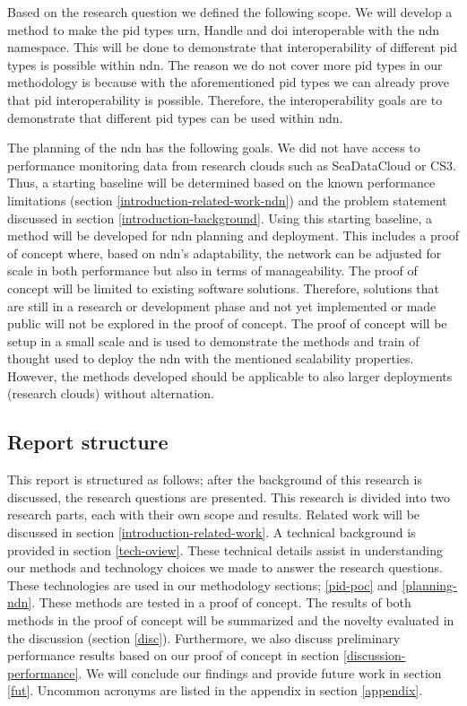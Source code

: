 
Based on the research question we defined the following scope. We will develop a method to make the \gls{pid} types \gls{urn}, Handle and \gls{doi} interoperable with the \gls{ndn} namespace. This will be done to demonstrate that interoperability of different \gls{pid} types is possible within \gls{ndn}. The reason we do not cover more \gls{pid} types in our methodology is because with the aforementioned \gls{pid} types we can already prove that \gls{pid} interoperability is possible. Therefore, the interoperability goals are to demonstrate that different \gls{pid} types can be used within \gls{ndn}.

The planning of the \gls{ndn} has the following goals. We did not have access to performance monitoring data from research clouds such as SeaDataCloud or CS3. Thus, a starting baseline will be determined based on the known performance limitations (section \ref{introduction-related-work-ndn}) and the problem statement discussed in section \ref{introduction-background}. Using this starting baseline, a method will be developed for \gls{ndn} planning and deployment. This includes a proof of concept where, based on \gls{ndn}'s adaptability, the network can be adjusted for scale in both performance but also in terms of manageability. The proof of concept will be limited to existing software solutions. Therefore, solutions that are still in a research or development phase and not yet implemented or made public will not be explored in the proof of concept. The proof of concept will be setup in a small scale and is used to demonstrate the methods and train of thought used to deploy the \gls{ndn} with the mentioned scalability properties. However, the methods developed should be applicable to also larger deployments (research clouds) without alternation.

\subsection{Report structure}
This report is structured as follows; after the background of this research is discussed, the research questions are presented. This research is divided into two research parts, each with their own scope and results. Related work will be discussed in section \ref{introduction-related-work}. A technical background is provided in section \ref{tech-oview}. These technical details assist in understanding our methods and technology choices we made to answer the research questions. These technologies are used in our methodology sections; \ref{pid-poc} and \ref{planning-ndn}. These methods are tested in a proof of concept. The results of both methods in the proof of concept will be summarized and the novelty evaluated in the discussion (section \ref{disc}). Furthermore, we also discuss preliminary performance results based on our proof of concept in section \ref{discussion-performance}. We will conclude our findings and provide future work in section \ref{fut}. Uncommon acronyms are listed in the appendix in section \ref{appendix}.



